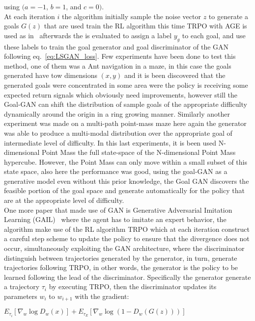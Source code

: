 using $(a = -1$, $b = 1$, and $c = 0)$. \\At each iteration $i$ the algorithm initially sample the noise vector $z$ to generate a goals $G(z)$  that are used train the RL algorithm this time TRPO with AGE is used as in~\cite{schulman2015high} afterwards the is evaluated to assign a label $y_g$ to each goal, and use these labels to train the goal generator and goal discriminator of the GAN following eq.~\ref{eq:LSGAN_loss}. Few experiments have been done to test this method, one of them was a Ant navigation in a maze, in this case the goals generated have tow dimensions $(x,y)$ and it is been discovered that the generated goals were concentrated in some area were the policy is receiving some expected return signals which obviously need improvements, however still the Goal-GAN can shift the distribution of sample goals of the appropriate difficulty dynamically around the origin in a ring growing manner. Similarly another experiment was made on a multi-path point-mass maze here again the generator was able to produce a multi-modal distribution over the appropriate goal of intermediate level of difficulty. In this last experiments, it is been used N-dimensional Point Mass the full state-space of the N-dimensional Point Mass hypercube. However, the Point Mass can only move within a small subset of this state space, also here the performance was good, using the goal-GAN as a generative model even
without this prior knowledge, the Goal GAN discovers the feasible portion of the goal space and generate automatically for the policy that are at the appropriate level of difficulty.\\
One more paper that made use of GAN is Generative Adversarial Imitation Learning (GAIL)~\cite{DBLP:journals/corr/HoE16} where the agent has to imitate an expert behavior, the algorithm make use of the RL algorithm TRPO which at each iteration construct a careful step scheme to update the policy to ensure that the divergence does not occur, simultaneously exploiting the GAN architecture, where the discriminator distinguish between trajectories generated by the generator, in turn, generate trajectories following TRPO, in other words, the generator is the policy to be learned following the lead of the discriminator. Specifically the generator generate a trajectory $\tau_i$ by executing TRPO, then the discriminator updates its parameters $w_i$ to $w_{i+1}$ with the gradient:
\begin{center}
	$E_{\tau_i}[\nabla_w\log{D_w(x)}] + E_{\tau_E}[\nabla_w\log{(1-D_w(G(z)))}]$
\end{center}
